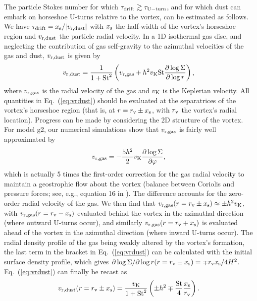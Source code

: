 \documentclass[a4paper,usenatbib]{mnras}
\begin{document}
The particle Stokes number for which $\tau_{\rm drift} \gtrsim
\tau_{\rm U-turn}$, and for which dust can embark on horseshoe U-turns
relative to the vortex, can be estimated as follows.  We have
$\tau_{\rm drift} = x_{\rm s} / |v_{\rm r,dust}|$ with $x_{\rm s}$ the
half-width of the vortex's horseshoe region and $v_{\rm r,dust}$ the
particle radial velocity. In a 1D isothermal gas disc, and neglecting
the contribution of gas self-gravity to the azimuthal velocities of
the gas and dust, $v_{\rm r,dust}$ is given by
\citep[e.g.,][]{TakeuchiLin02}
\begin{equation}
v_{\rm r,dust} = \frac{1}{1+{\rm St}^2} \left( 
v_{\rm r,gas} + h^2 v_{\rm K} {\rm St} \frac{\partial\log\Sigma}{\partial\log r}
\right),
\label{eq:vrdust}
\end{equation}
where $v_{\rm r,gas}$ is the radial velocity of the gas and $v_{\rm
  K}$ is the Keplerian velocity. All quantities in
Eq.~(\ref{eq:vrdust}) should be evaluated at the separatrices of the
vortex's horseshoe region (that is, at $r = r_{\rm v} \pm x_{\rm s}$,
with $r_{\rm v}$ the vortex's radial location). Progress can be made
by considering the 2D structure of the vortex. For model g2, our
numerical simulations show that $v_{\rm r,gas}$ is fairly well
approximated by
\begin{equation}
v_{\rm r,gas} = -\frac{5h^2}{2} v_{\rm K} \frac{\partial\log\Sigma}{\partial\varphi}, 
\end{equation}
which is actually 5 times the first-order correction for the gas
radial velocity to maintain a geostrophic flow about the vortex
(balance between Coriolis and pressure forces; see, e.g., equation 16
in \citealp{MC15}). The difference accounts for the zero-order radial
velocity of the gas. We then find that $v_{\rm r,gas}(r = r_{\rm v}
\pm x_{\rm s}) \approx \pm h^2 v_{\rm K}$, with $v_{\rm r,gas}(r =
r_{\rm v} - x_{\rm s})$ evaluated behind the vortex in the azimuthal
direction (where outward U-turns occur), and similarly $v_{\rm
  r,gas}(r = r_{\rm v} + x_{\rm s})$ is evaluated ahead of the vortex
in the azimuthal direction (where inward U-turns occur). The radial
density profile of the gas being weakly altered by the vortex's
formation, the last term in the bracket in Eq.~(\ref{eq:vrdust}) can
be calculated with the initial surface density profile, which gives
$\partial\log\Sigma / \partial\log r (r = r_{\rm v} \pm x_{\rm s}) =
\mp r_{\rm v} x_{\rm s} / 4H^2$. Eq.~(\ref{eq:vrdust}) can finally be
recast as
\begin{equation}
v_{\rm r,dust}(r = r_{\rm v} \pm x_{\rm s}) = \frac{v_{\rm K}}{1+{\rm St}^2} \left( 
\pm h^2
\mp \frac{{\rm St}}{4} \frac{x_{\rm s}}{r_{\rm v}} 
\right).
\label{eq:vrdust2}
\end{equation}
\end{document}
